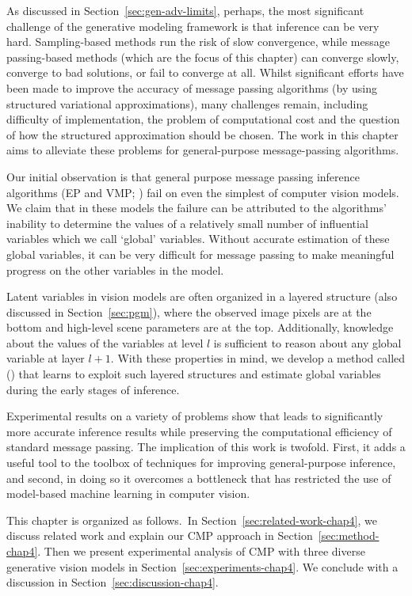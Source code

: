 As discussed in Section~\ref{sec:gen-adv-limits}, perhaps, the most significant challenge of the generative modeling framework is that inference can be very hard. Sampling-based methods run the risk of slow convergence, while message passing-based methods (which are the focus of this chapter) can converge slowly, converge to bad solutions, or fail to converge at all. Whilst significant efforts have been made to improve the accuracy of message passing algorithms (\eg by using structured variational approximations), many challenges remain, including difficulty of implementation, the problem of computational cost and the question of how the structured approximation should be chosen. The work
in this chapter aims to alleviate these problems for general-purpose message-passing algorithms.

Our initial observation is that general purpose message passing inference algorithms (\eg EP and VMP; \cite{Minka2001,Winn2005}) fail on even the simplest of computer vision models. We claim that in these models the failure can be attributed to the algorithms' inability to determine the values of a relatively small number of influential variables which we call `global' variables. Without accurate estimation of these global variables, it can be very difficult for message passing to make meaningful progress on the other variables in the model.

Latent variables in vision models are often organized in a layered structure (also discussed in
Section~\ref{sec:pgm}), where the observed image pixels are at the bottom and high-level scene parameters are at
the top. Additionally, knowledge about the values of the variables at level $l$ is sufficient to reason about
any global variable at layer $l+1$. With these properties in mind, we develop a method called \emph{\METHOD}
(\MTD) that learns to exploit such layered structures and estimate global variables during the early stages of
inference.

Experimental results on a variety of problems show that \MTD leads to significantly more accurate inference results while preserving the computational efficiency of standard message passing. The implication of this work is twofold. First, it adds a useful tool to the toolbox of techniques for improving general-purpose inference, and second, in doing so it overcomes a bottleneck that has restricted the use of model-based machine learning in computer vision.

This chapter is organized as follows.~In Section~\ref{sec:related-work-chap4},
we discuss related work and explain our CMP approach in Section~\ref{sec:method-chap4}.
Then we present experimental analysis of
CMP with three diverse generative vision models in Section~\ref{sec:experiments-chap4}.
We conclude with a discussion in Section~\ref{sec:discussion-chap4}.


